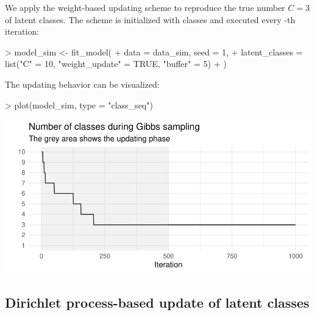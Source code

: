 \documentclass[article,shortnames]{jss}
\begin{document}
We apply the weight-based updating scheme to reproduce the true number $C = 3$ of latent classes. The scheme is initialized with  classes and executed every -th iteration:

\begin{Schunk}
\begin{Sinput}
> model_sim <- fit_model(
+    data = data_sim, seed = 1,
+    latent_classes = list("C" = 10, "weight_update" = TRUE, "buffer" = 5)
+  )
\end{Sinput}
\end{Schunk}

\newpage

The updating behavior can be visualized:

\begin{Schunk}
\begin{Sinput}
> plot(model_sim, type = "class_seq")
\end{Sinput}
\end{Schunk}
\includegraphics{rprobitb_oelschlaeger_bauer-model-sim-class-seq}

\subsection{Dirichlet process-based update of latent classes} \label{subsec:dp_update}
\end{document}
